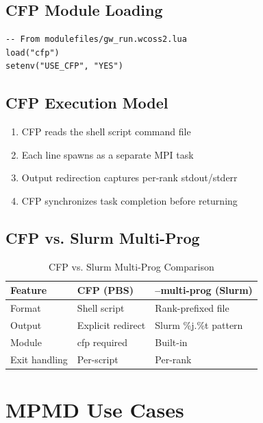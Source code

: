 \documentclass[11pt,a4paper,twoside]{article}
\begin{document}
\subsection{CFP Module Loading}

\begin{lstlisting}[style=luastyle,caption={CFP Module in WCOSS2 Runtime},label={lst:cfpmod}]
-- From modulefiles/gw_run.wcoss2.lua
load("cfp")
setenv("USE_CFP", "YES")
\end{lstlisting}

\subsection{CFP Execution Model}

\begin{enumerate}
    \item CFP reads the shell script command file
    \item Each line spawns as a separate MPI task
    \item Output redirection captures per-rank stdout/stderr
    \item CFP synchronizes task completion before returning
\end{enumerate}

\subsection{CFP vs. Slurm Multi-Prog}

\begin{table}[H]
\centering
\caption{CFP vs. Slurm Multi-Prog Comparison}
\label{tab:cfpslurm}
\begin{tabular}{@{}lll@{}}
\toprule
\textbf{Feature} & \textbf{CFP (PBS)} & \textbf{--multi-prog (Slurm)} \\
\midrule
Format & Shell script & Rank-prefixed file \\
Output & Explicit redirect & Slurm \%j.\%t pattern \\
Module & cfp required & Built-in \\
Exit handling & Per-script & Per-rank \\
\bottomrule
\end{tabular}
\end{table}

\section{MPMD Use Cases}
\label{sec:usecases}
\end{document}
